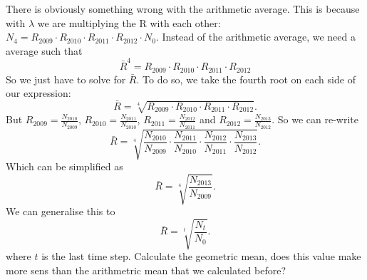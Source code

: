 \documentclass{article}\usepackage[]{graphicx}\usepackage[]{color}
\begin{document}
\noindent There is obviously something wrong with the arithmetic average. This is because with $\lambda$ we are multiplying the R with each other: $N_4=R_{2009} \cdot R_{2010} \cdot R_{2011} \cdot R_{2012} \cdot N_0$. Instead of the arithmetic average, we need a average such that
\begin{equation}
\bar R^4=R_{2009} \cdot R_{2010} \cdot R_{2011} \cdot R_{2012}
\end{equation}
\noindent So we just have to solve for $\bar R$. To do so, we take the fourth root on each side of our expression:
\begin{equation}
\bar{R}=\sqrt[4]{R_{2009} \cdot R_{2010} \cdot R_{2011} \cdot R_{2012}}.
\end{equation}
But $R_{2009}=\frac{N_{2010}}{N_{2009}}$, $R_{2010}=\frac{N_{2011}}{N_{2010}}$,  $R_{2011}=\frac{N_{2012}}{N_{2011}}$ and  $R_{2012}=\frac{N_{2013}}{N_{2012}}$. So we can re-write
\begin{equation}
\bar R=\sqrt[4]{\frac{N_{2010}}{N_{2009}} \cdot \frac{N_{2011}}{N_{2010}} \cdot \frac{N_{2012}}{N_{2011}} \cdot \frac{N_{2013}}{N_{2012}}}.
\end{equation}
Which can be simplified as
\begin{equation}
\bar R=\sqrt[4]{\frac{N_{2013}}{N_{2009}}}.
\end{equation}
\noindent We can generalise this to
\begin{equation}
\bar R=\sqrt[t]{\frac{N_{t}}{N_{0}}}.
\end{equation}
where $t$ is the last time step. Calculate the geometric mean, does this value make more sens than the arithmetric mean that we calculated before? 

\end{document}

